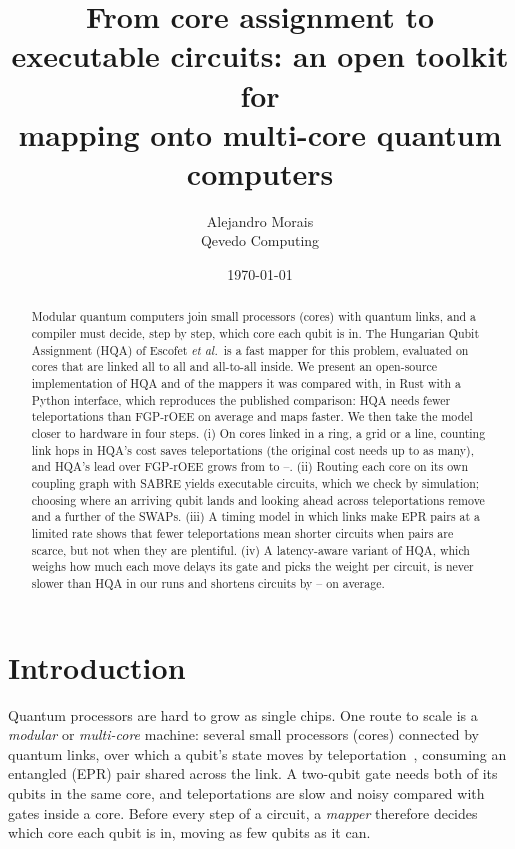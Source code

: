\documentclass[11pt]{article}
\title{From core assignment to executable circuits: an open toolkit for\\
mapping onto multi-core quantum computers}
\author{Alejandro Morais\\
Qevedo Computing}
\date{\today}
\begin{document}
\maketitle

\begin{abstract}
Modular quantum computers join small processors (cores) with quantum links,
and a compiler must decide, step by step, which core each qubit is in. The
Hungarian Qubit Assignment (HQA) of Escofet \emph{et al.}\ is a fast mapper
for this problem, evaluated on cores that are linked all to all and
all-to-all inside. We present an open-source implementation of HQA and of the
mappers it was compared with, in Rust with a Python interface, which
reproduces the published comparison: HQA needs \fgpOverHqa{} fewer
teleportations than FGP-rOEE on average and maps \hqaSpeedup{} faster. We then
take the model closer to hardware in four steps. (i) On cores linked in a
ring, a grid or a line, counting link hops in HQA's cost saves teleportations
(the original cost needs up to \uniformLine{} as many), and HQA's lead over
FGP-rOEE grows from \fgpAlltoall{} to \fgpGrid{}--\fgpRing{}. (ii) Routing each core on its own coupling graph with
SABRE yields executable circuits, which we check by simulation; choosing
where an arriving qubit lands and looking ahead across teleportations remove
\slotSaving{} and a further \lookAheadSaving{} of the SWAPs. (iii) A timing
model in which links make EPR pairs at a limited rate shows that fewer
teleportations mean shorter circuits when pairs are scarce, but not when
they are plentiful. (iv) A latency-aware variant of HQA, which weighs how
much each move delays its gate and picks the weight per circuit, is never
slower than HQA in our runs and shortens circuits by
\latencyMeanWorst{}--\latencyMeanBest{} on average.
\end{abstract}

\section{Introduction}

Quantum processors are hard to grow as single chips. One route to scale is a
\emph{modular} or \emph{multi-core} machine: several small processors
(cores) connected by quantum links, over which a qubit's state moves by
teleportation~\cite{bennett1993teleporting}, consuming an entangled (EPR)
pair shared across the link. A two-qubit gate needs both of its qubits in
the same core, and teleportations are slow and noisy compared with gates
inside a core. Before every step of a circuit, a \emph{mapper} therefore
decides which core each qubit is in, moving as few qubits as it can.
\end{document}
